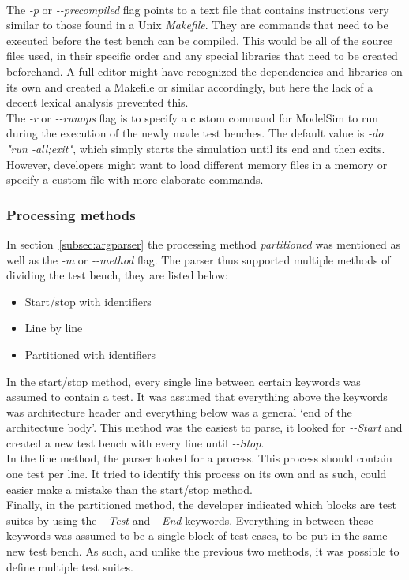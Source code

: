\documentclass[11pt,british]{article}
\begin{document}
\\[\baselineskip]
The \emph{-p} or \emph{-\--precompiled} flag points to a text file that contains instructions very similar to those found in a Unix \emph{Makefile}. They are commands that need to be executed before the test bench can be compiled. This would be all of the source files used, in their specific order and any special libraries that need to be created beforehand. A full editor might have recognized the dependencies and libraries on its own and created a Makefile or similar accordingly, but here the lack of a decent lexical analysis prevented this.
\\[\baselineskip]
The \emph{-r} or \emph{-\--runops} flag is to specify a custom command for ModelSim to run during the execution of the newly made test benches. The default value is \emph{-do "run -all;exit"}, which simply starts the simulation until its end and then exits. However, developers might want to load different memory files in a memory or specify a custom file with more elaborate commands.

\subsubsection{Processing methods}
\label{subsubsec:processmethods}
In section~\ref{subsec:argparser} the processing method \emph{partitioned} was mentioned as well as the \emph{-m} or \emph{-\--method} flag. The parser thus supported multiple methods of dividing the test bench, they are listed below:
\begin{itemize}%
\item Start/stop with identifiers
\item Line by line 
\item Partitioned with identifiers
\end{itemize}
In the start/stop method, every single line between certain keywords was assumed to contain a test. It was assumed that everything above the keywords was architecture header and everything below was a general `end of the architecture body'. This method was the easiest to parse, it looked for \emph{-\--Start} and created a new test bench with every line until \emph{-\--Stop}.
\\[\baselineskip]
In the line method, the parser looked for a process. This process should contain one test per line. It tried to identify this process on its own and as such, could easier make a mistake than the start/stop method.
\\[\baselineskip]
Finally, in the partitioned method, the developer indicated which blocks are test suites by using the \emph{-\--Test} and \emph{-\--End} keywords. Everything in between these keywords was assumed to be a single block of test cases, to be put in the same new test bench. As such, and unlike the previous two methods, it was possible to define multiple test suites. 
\end{document}
